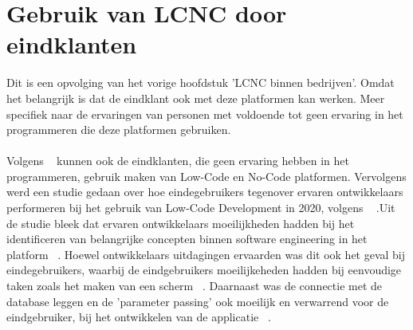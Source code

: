 \section{Gebruik van LCNC door eindklanten}
\label{sec:lcnc-eindklanten}
Dit is een opvolging van het vorige hoofdstuk 'LCNC binnen bedrijven'. Omdat het belangrijk is dat de eindklant ook met deze platformen kan werken.
Meer specifiek naar de ervaringen van personen met voldoende  tot geen ervaring in het programmeren die deze platformen gebruiken.
\\
\\
Volgens ~\textcite{Yan2021} kunnen ook de eindklanten, die geen ervaring hebben in het programmeren, gebruik maken van Low-Code en No-Code platformen.
Vervolgens werd een studie gedaan over hoe eindegebruikers tegenover ervaren ontwikkelaars performeren bij het gebruik van Low-Code Development  in 2020, volgens ~\textcite{Hintsch2021} 
.Uit de studie bleek dat ervaren ontwikkelaars moeilijkheden hadden bij het identificeren van belangrijke concepten binnen software engineering in het platform ~\autocite{Hintsch2021}.
Hoewel ontwikkelaars uitdagingen ervaarden was dit ook het geval bij eindegebruikers, waarbij de eindgebruikers moeilijkeheden hadden bij eenvoudige taken zoals het maken van een scherm  ~\autocite{Hintsch2021}.
Daarnaast was de connectie met de database leggen en de 'parameter passing' ook moeilijk en verwarrend voor de eindgebruiker, bij het ontwikkelen van de applicatie  ~\autocite{Hintsch2021}.






